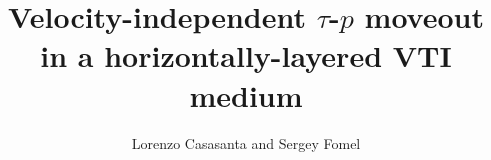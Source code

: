 

\newcommand{\tick}{\ding{51}}
\newcommand{\taup}{$\tau$-$p$~}
\newcommand{\tx}{$t$-$X$~}
\def\quotetation#1{``#1''}

\title{Velocity-independent $\tau$-$p$ moveout 
in a horizontally-layered VTI medium } 


\author{Lorenzo Casasanta and Sergey Fomel}

\address{
\footnotemark[1]formerly: Politecnico di Milano \\
Piazza Leonardo da Vinci, 32 \\
20133 Milano \\ Italy \\
casasanta@elet.polimi.it \\ 
presently: CGGVeritas Services \\
Crompton Way, Manor Royal Estate \\
Crawley, West Sussex RH10 9QN \\UK \\
lorenzo.casasanta@cggveritas.com \\
\footnotemark[2]Bureau of Economic Geology, \\
John A. and Katherine G. Jackson School of Geosciences \\
The University of Texas at Austin \\
University Station, Box X \\
Austin, TX 78713-8972 \\ USA \\
sergey.fomel@beg.utexas.edu
}

\maketitle

%













